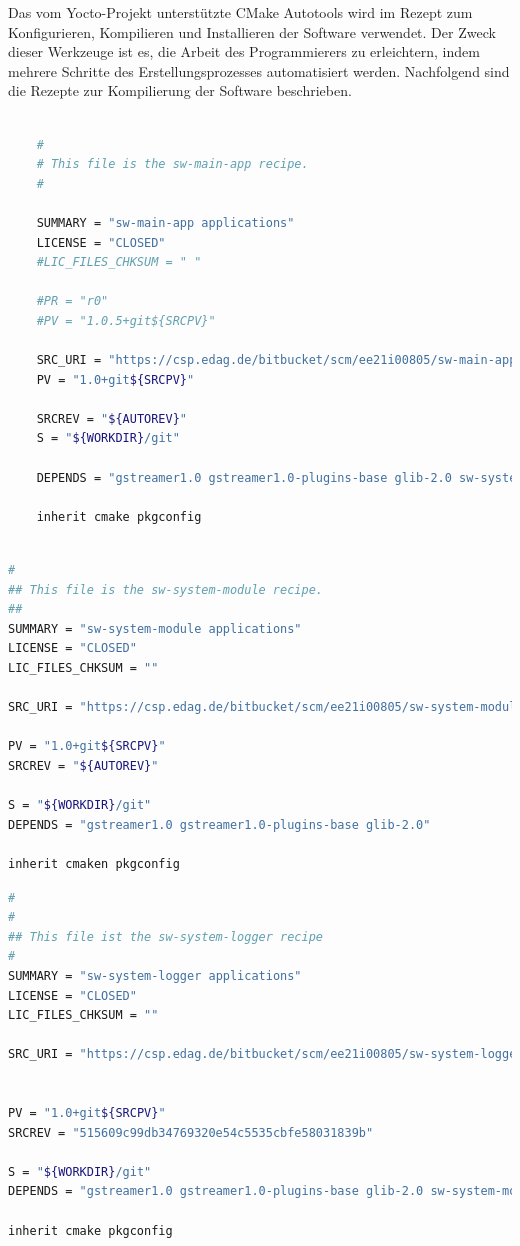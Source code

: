 Das vom Yocto-Projekt unterstützte CMake Autotools wird im Rezept zum Konfigurieren, Kompilieren und Installieren der Software verwendet. Der Zweck dieser Werkzeuge ist es, die Arbeit des Programmierers zu erleichtern, indem mehrere Schritte des Erstellungsprozesses automatisiert werden. Nachfolgend sind die Rezepte zur Kompilierung der Software beschrieben.

\begin{lstlisting}[backgroundcolor = \color{lightgray},basicstyle=\scriptsize\ttfamily,caption={Rezept für das sw-main-app Modul},label=lst:sw_main_app:modul,language=bash,framexleftmargin = 2em]
	
	#
	# This file is the sw-main-app recipe.
	#
	
	SUMMARY = "sw-main-app applications"
	LICENSE = "CLOSED" 
	#LIC_FILES_CHKSUM = " "
	
	#PR = "r0"
	#PV = "1.0.5+git${SRCPV}"
	
	SRC_URI = "https://csp.edag.de/bitbucket/scm/ee21i00805/sw-main-app.git"
	PV = "1.0+git${SRCPV}"
	
	SRCREV = "${AUTOREV}"
	S = "${WORKDIR}/git"
	
	DEPENDS = "gstreamer1.0 gstreamer1.0-plugins-base glib-2.0 sw-system-module sw-system-logger"
	
	inherit cmake pkgconfig 
	
\end{lstlisting}

\begin{lstlisting}[backgroundcolor = \color{lightgray},basicstyle=\scriptsize\ttfamily,caption={Rezept für das sw-system-module Modul},label=lst:sw_system_module:modul,language=bash,framexleftmargin = 2em]
#
## This file is the sw-system-module recipe.
##
SUMMARY = "sw-system-module applications"
LICENSE = "CLOSED"
LIC_FILES_CHKSUM = ""

SRC_URI = "https://csp.edag.de/bitbucket/scm/ee21i00805/sw-system-module.git"

PV = "1.0+git${SRCPV}"
SRCREV = "${AUTOREV}"

S = "${WORKDIR}/git"
DEPENDS = "gstreamer1.0 gstreamer1.0-plugins-base glib-2.0"

inherit cmaken pkgconfig

\end{lstlisting}
\newpage
\begin{lstlisting}[backgroundcolor = \color{lightgray},basicstyle=\scriptsize\ttfamily,caption={Rezept für das sw-system-module Modul},label=lst:sw_system_logger:modul,language=bash,framexleftmargin = 2em]
#
#
## This file ist the sw-system-logger recipe
# 
SUMMARY = "sw-system-logger applications"                          
LICENSE = "CLOSED"
LIC_FILES_CHKSUM = ""

SRC_URI = "https://csp.edag.de/bitbucket/scm/ee21i00805/sw-system-logger.git"


PV = "1.0+git${SRCPV}"
SRCREV = "515609c99db34769320e54c5535cbfe58031839b"

S = "${WORKDIR}/git"
DEPENDS = "gstreamer1.0 gstreamer1.0-plugins-base glib-2.0 sw-system-module"

inherit cmake pkgconfig
\end{lstlisting}

